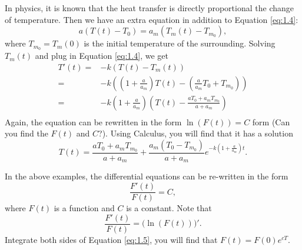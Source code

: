 \begin{example}
  In physics, it is known that the heat transfer is directly proportional the change of temperature. Then we have an extra equation in addition to Equation \ref{eq:1.4}:
  $$
    a(T(t)-T_0)=a_m(T_m(t)-T_{m_0}),
  $$
  where $T_{m_0}=T_m(0)$ is the initial temperature of the surrounding.
  Solving $T_m(t)$ and plug in Equation \ref{eq:1.4}, we get
  \begin{align*}
    T'(t) = & -k(T(t)-T_m(t))                                                                           \\
    =       & -k\left(\left(1 + \frac{a}{a_m}\right)T(t) -\left(\frac{a}{a_m} T_0+T_{m_0}\right)\right) \\
    =       & -k\left(1 + \frac{a}{a_m}\right)\left(T(t) -\frac{a T_0 + a_mT_{m_0}}{a+a_m}\right)       \\
  \end{align*}
  Again, the equation can be rewritten in the form $\ln(F(t))=C$ form (Can you find the $F(t)$ and $C$?).
  Using Calculus, you will find that it has a solution
  $$
    T(t) = \frac{ a T_{0} + a_{m} T_{m_0} }{ a + a_{m} } + \frac{ a_{m} ( T_{0} - T_{m_0}) } { a + a_{m} } e^{ - k ( 1 + \frac{a}{a_{m}}) t }.
  $$
\end{example}

\begin{remark}
  In the above examples, the differential equations can be re-written in the form
  \begin{equation}
    \frac{F'(t)}{F(t)}=C,
    \label{eq:1.5}
  \end{equation}
  where $F(t)$ is a function and $C$ is a constant.
  Note that
  $$
    \frac{F'(t)}{F(t)}=\Big(\ln(F(t))\Big)'.
  $$
  Integrate both sides of Equation \ref{eq:1.5}, you will find that $F(t)=F(0)e^{cT}$.
\end{remark}


